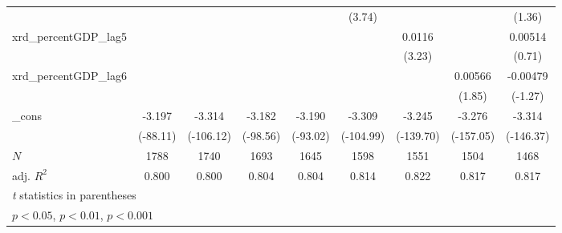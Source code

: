 {\begin{tabular}{l*{8}{c}}
          &                  &                  &                  &                  &   (3.74)         &                  &                  &   (1.36)         \\
\addlinespace
xrd\_percentGDP\_lag5&                  &                  &                  &                  &                  &   0.0116\sym{**} &                  &  0.00514         \\
          &                  &                  &                  &                  &                  &   (3.23)         &                  &   (0.71)         \\
\addlinespace
xrd\_percentGDP\_lag6&                  &                  &                  &                  &                  &                  &  0.00566         & -0.00479         \\
          &                  &                  &                  &                  &                  &                  &   (1.85)         &  (-1.27)         \\
\addlinespace
\_cons    &   -3.197\sym{***}&   -3.314\sym{***}&   -3.182\sym{***}&   -3.190\sym{***}&   -3.309\sym{***}&   -3.245\sym{***}&   -3.276\sym{***}&   -3.314\sym{***}\\
          & (-88.11)         &(-106.12)         & (-98.56)         & (-93.02)         &(-104.99)         &(-139.70)         &(-157.05)         &(-146.37)         \\
\midrule
\(N\)     &     1788         &     1740         &     1693         &     1645         &     1598         &     1551         &     1504         &     1468         \\
adj. \(R^{2}\)&    0.800         &    0.800         &    0.804         &    0.804         &    0.814         &    0.822         &    0.817         &    0.817         \\
\bottomrule
\multicolumn{9}{l}{\footnotesize \textit{t} statistics in parentheses}\\
\multicolumn{9}{l}{\footnotesize \sym{*} \(p<0.05\), \sym{**} \(p<0.01\), \sym{***} \(p<0.001\)}\\
\end{tabular}
}
